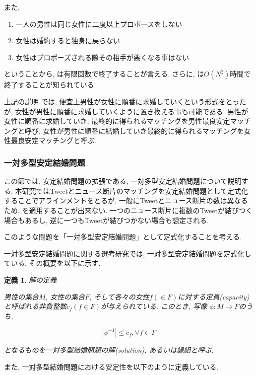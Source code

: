 \documentclass[12pt]{jarticle}
\newtheorem{definittion}{定義}[section]
\begin{document}
また, 
\begin{enumerate}
\item 一人の男性は同じ女性に二度以上プロポースをしない
\item 女性は婚約すると独身に戻らない
\item 女性はプロポーズされる際その相手が悪くなる事はない
\end{enumerate}

ということから, \gsa は有限回数で終了することが言える. さらに, \gsa は$O(N^2)$時間で終了することが知られている. 

上記の説明 では, 便宜上男性が女性に順番に求婚していくという形式をとったが, 女性が男性に順番に求婚していくように置き換える事も可能である. 
男性が女性に順番に求婚していき, 最終的に得られるマッチングを男性最良安定マッチングと呼び, 女性が男性に順番に結婚していき最終的に得られるマッチングを女性最良安定マッチングと呼ぶ. 

\subsubsection{一対多型安定結婚問題}
この節では, 安定結婚問題の拡張である, 一対多型安定結婚問題について説明する. 
本研究ではTweetとニュース断片のマッチングを安定結婚問題として定式化することでアラインメントをとるが, 一般にTweetとニュース断片の数は異なるため, \gsa を適用することが出来ない. 
一つのニュース断片に複数のTweetが結びつく場合もあるし, 逆に一つもTweetが結びつかない場合も想定される. 

このような問題を「一対多型安定結婚問題」として定式化することを考える. 

一対多型安定結婚問題に関する選考研究\cite{psmp}では, 一対多型安定結婚問題を定式化している. その概要を以下に示す. 

\begin{definittion}
\label{psmp_def_1}
解の定義

男性の集合$M$, 女性の集合$F$, そして各々の女性$f(\in F)$に対する定員(capacity)と呼ばれる非負整数$c_f(f \in F)$が与えられている. このとき, 写像 $\phi : M \rightarrow F$のうち, 

\begin{equation}
| \phi^{-1} | \leq c_f, \forall f \in F
\end{equation}

となるものを一対多型結婚問題の解(solution), あるいは縁組と呼ぶ.
\end{definittion}

また, 一対多型結婚問題における安定性を以下のように定義している. 
\end{document}
